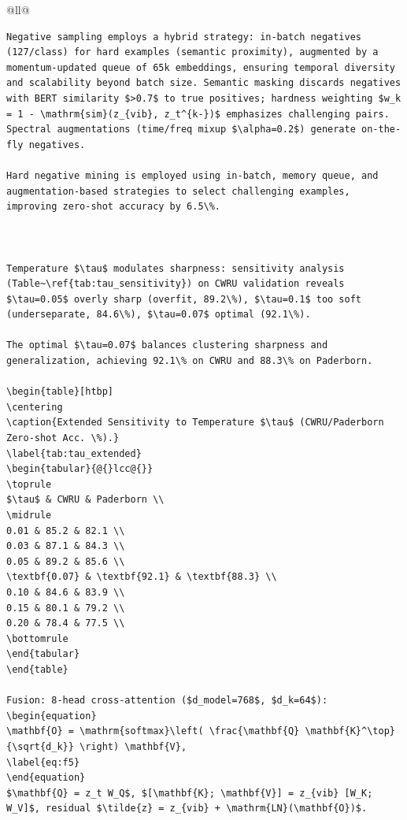 \begin{table}[htbp]
\begin{tabular}{@{}ll@{}}
\begin{verbatim}
Negative sampling employs a hybrid strategy: in-batch negatives (127/class) for hard examples (semantic proximity), augmented by a momentum-updated queue of 65k embeddings, ensuring temporal diversity and scalability beyond batch size. Semantic masking discards negatives with BERT similarity $>0.7$ to true positives; hardness weighting $w_k = 1 - \mathrm{sim}(z_{vib}, z_t^{k-})$ emphasizes challenging pairs. Spectral augmentations (time/freq mixup $\alpha=0.2$) generate on-the-fly negatives.

Hard negative mining is employed using in-batch, memory queue, and augmentation-based strategies to select challenging examples, improving zero-shot accuracy by 6.5\%.



Temperature $\tau$ modulates sharpness: sensitivity analysis (Table~\ref{tab:tau_sensitivity}) on CWRU validation reveals $\tau=0.05$ overly sharp (overfit, 89.2\%), $\tau=0.1$ too soft (underseparate, 84.6\%), $\tau=0.07$ optimal (92.1\%). 

The optimal $\tau=0.07$ balances clustering sharpness and generalization, achieving 92.1\% on CWRU and 88.3\% on Paderborn.

\begin{table}[htbp]
\centering
\caption{Extended Sensitivity to Temperature $\tau$ (CWRU/Paderborn Zero-shot Acc. \%).}
\label{tab:tau_extended}
\begin{tabular}{@{}lcc@{}}
\toprule
$\tau$ & CWRU & Paderborn \\
\midrule
0.01 & 85.2 & 82.1 \\
0.03 & 87.1 & 84.3 \\
0.05 & 89.2 & 85.6 \\
\textbf{0.07} & \textbf{92.1} & \textbf{88.3} \\
0.10 & 84.6 & 83.9 \\
0.15 & 80.1 & 79.2 \\
0.20 & 78.4 & 77.5 \\
\bottomrule
\end{tabular}
\end{table}

Fusion: 8-head cross-attention ($d_model=768$, $d_k=64$):
\begin{equation}
\mathbf{O} = \mathrm{softmax}\left( \frac{\mathbf{Q} \mathbf{K}^\top}{\sqrt{d_k}} \right) \mathbf{V},
\label{eq:f5}
\end{equation}
$\mathbf{Q} = z_t W_Q$, $[\mathbf{K}; \mathbf{V}] = z_{vib} [W_K; W_V]$, residual $\tilde{z} = z_{vib} + \mathrm{LN}(\mathbf{O})$.


\end{verbatim}
\end{tabular}
\end{table}
